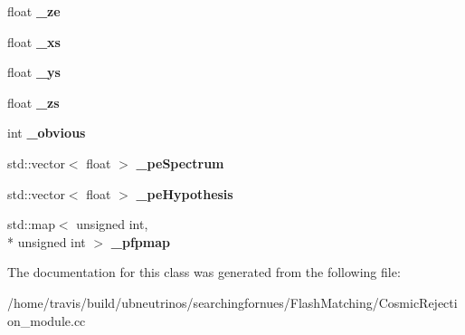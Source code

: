 \begin{DoxyCompactItemize}
\item 
\hypertarget{classCosmicRejection_a577912c55709ae4899aa9381034babe4}{float {\bfseries \-\_\-ze}}\label{classCosmicRejection_a577912c55709ae4899aa9381034babe4}

\item 
\hypertarget{classCosmicRejection_a3d9f8e6b3c8b618de508fe4fc0d481bd}{float {\bfseries \-\_\-xs}}\label{classCosmicRejection_a3d9f8e6b3c8b618de508fe4fc0d481bd}

\item 
\hypertarget{classCosmicRejection_aaec4fa1fe29d24b18e27bb90f23f5615}{float {\bfseries \-\_\-ys}}\label{classCosmicRejection_aaec4fa1fe29d24b18e27bb90f23f5615}

\item 
\hypertarget{classCosmicRejection_af6eb1f4fc0e76bd7767fee1853ea9df0}{float {\bfseries \-\_\-zs}}\label{classCosmicRejection_af6eb1f4fc0e76bd7767fee1853ea9df0}

\item 
\hypertarget{classCosmicRejection_a67ce3a575fc7851f38c25e72b0fa5ba7}{int {\bfseries \-\_\-obvious}}\label{classCosmicRejection_a67ce3a575fc7851f38c25e72b0fa5ba7}

\item 
\hypertarget{classCosmicRejection_ad779ba81aabfa19efc0bb5ff510efc1f}{std\-::vector$<$ float $>$ {\bfseries \-\_\-pe\-Spectrum}}\label{classCosmicRejection_ad779ba81aabfa19efc0bb5ff510efc1f}

\item 
\hypertarget{classCosmicRejection_a8a5730ec0de3b8a24c74a68a0da49933}{std\-::vector$<$ float $>$ {\bfseries \-\_\-pe\-Hypothesis}}\label{classCosmicRejection_a8a5730ec0de3b8a24c74a68a0da49933}

\item 
\hypertarget{classCosmicRejection_ab7db5d48133461aa8039101823987404}{std\-::map$<$ unsigned int, \\*
unsigned int $>$ {\bfseries \-\_\-pfpmap}}\label{classCosmicRejection_ab7db5d48133461aa8039101823987404}

\end{DoxyCompactItemize}


The documentation for this class was generated from the following file\-:\begin{DoxyCompactItemize}
\item 
/home/travis/build/ubneutrinos/searchingfornues/\-Flash\-Matching/Cosmic\-Rejection\-\_\-module.\-cc\end{DoxyCompactItemize}
